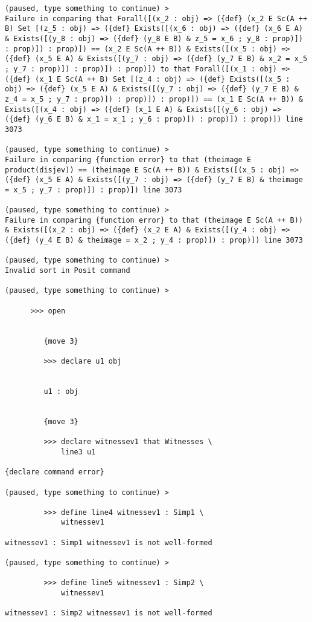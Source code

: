 \documentclass[12pt]{article}
\begin{document}
\begin{verbatim}
(paused, type something to continue) >
Failure in comparing that Forall([(x_2 : obj) => ({def} (x_2 E Sc(A ++ B) Set [(z_5 : obj) => ({def} Exists([(x_6 : obj) => ({def} (x_6 E A) & Exists([(y_8 : obj) => ({def} (y_8 E B) & z_5 = x_6 ; y_8 : prop)]) : prop)]) : prop)]) == (x_2 E Sc(A ++ B)) & Exists([(x_5 : obj) => ({def} (x_5 E A) & Exists([(y_7 : obj) => ({def} (y_7 E B) & x_2 = x_5 ; y_7 : prop)]) : prop)]) : prop)]) to that Forall([(x_1 : obj) => ({def} (x_1 E Sc(A ++ B) Set [(z_4 : obj) => ({def} Exists([(x_5 : obj) => ({def} (x_5 E A) & Exists([(y_7 : obj) => ({def} (y_7 E B) & z_4 = x_5 ; y_7 : prop)]) : prop)]) : prop)]) == (x_1 E Sc(A ++ B)) & Exists([(x_4 : obj) => ({def} (x_1 E A) & Exists([(y_6 : obj) => ({def} (y_6 E B) & x_1 = x_1 ; y_6 : prop)]) : prop)]) : prop)]) line 3073

(paused, type something to continue) >
Failure in comparing {function error} to that (theimage E product(disjev)) == (theimage E Sc(A ++ B)) & Exists([(x_5 : obj) => ({def} (x_5 E A) & Exists([(y_7 : obj) => ({def} (y_7 E B) & theimage = x_5 ; y_7 : prop)]) : prop)]) line 3073

(paused, type something to continue) >
Failure in comparing {function error} to that (theimage E Sc(A ++ B)) & Exists([(x_2 : obj) => ({def} (x_2 E A) & Exists([(y_4 : obj) => ({def} (y_4 E B) & theimage = x_2 ; y_4 : prop)]) : prop)]) line 3073

(paused, type something to continue) >
Invalid sort in Posit command

(paused, type something to continue) >

      >>> open


         {move 3}

         >>> declare u1 obj


         u1 : obj


         {move 3}

         >>> declare witnessev1 that Witnesses \
             line3 u1

{declare command error}

(paused, type something to continue) >

         >>> define line4 witnessev1 : Simp1 \
             witnessev1

witnessev1 : Simp1 witnessev1 is not well-formed

(paused, type something to continue) >

         >>> define line5 witnessev1 : Simp2 \
             witnessev1

witnessev1 : Simp2 witnessev1 is not well-formed


\end{verbatim}
\end{document}
